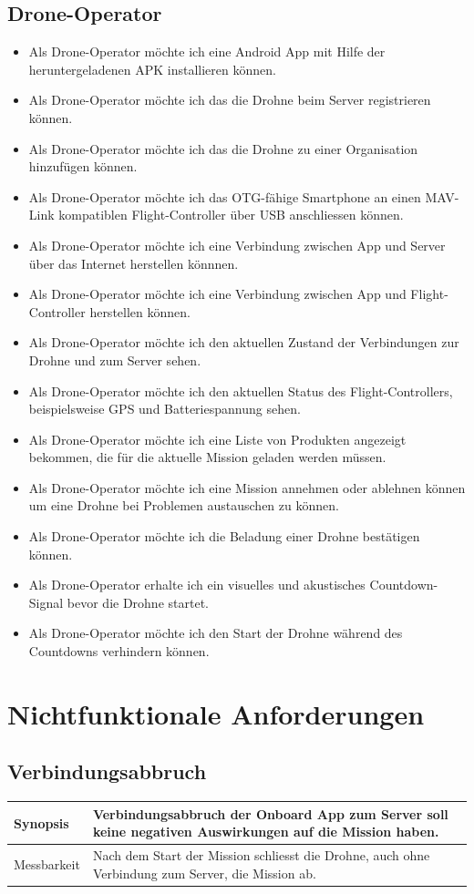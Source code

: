 \subsection{Drone-Operator}
\begin{itemize}
	\item Als Drone-Operator möchte ich eine Android App mit Hilfe der heruntergeladenen \Gls{APK} installieren können.
	\item Als Drone-Operator möchte ich das die Drohne beim Server registrieren können.
	\item Als Drone-Operator möchte ich das die Drohne zu einer Organisation hinzufügen können.
	\item Als Drone-Operator möchte ich das \Gls{OTG}-fähige Smartphone an einen MAV-Link kompatiblen Flight-Controller über USB anschliessen können.
	\item Als Drone-Operator möchte ich eine Verbindung zwischen App und Server über das Internet herstellen könnnen.
	\item Als Drone-Operator möchte ich eine Verbindung zwischen App und Flight-Controller herstellen können.
	\item Als Drone-Operator möchte ich den aktuellen Zustand der Verbindungen zur Drohne und zum Server sehen.
	\item Als Drone-Operator möchte ich den aktuellen Status des \Gls{Flight-Controllers}, beispielsweise GPS und Batteriespannung sehen.
	\item Als Drone-Operator möchte ich eine Liste von Produkten angezeigt bekommen, die für die aktuelle Mission geladen werden müssen.
	\item Als Drone-Operator möchte ich eine Mission annehmen oder ablehnen können um eine Drohne bei Problemen austauschen zu können.
	\item Als Drone-Operator möchte ich die Beladung einer Drohne bestätigen können.
	\item Als Drone-Operator erhalte ich ein visuelles und akustisches Countdown-Signal bevor die Drohne startet.
	\item Als Drone-Operator möchte ich den Start der Drohne während des Countdowns verhindern können.
\end{itemize}
\newpage
\section{Nichtfunktionale Anforderungen}
\subsection{Verbindungsabbruch}
\begin{tabular}{|p{}|p{}|} \hline
	Synopsis & Verbindungsabbruch der Onboard App zum Server soll keine negativen Auswirkungen auf die Mission haben.  \\ \hline
		
	Messbarkeit & Nach dem Start der Mission schliesst die Drohne, auch ohne Verbindung zum Server, die Mission ab. \\ \hline
\end{tabular}

